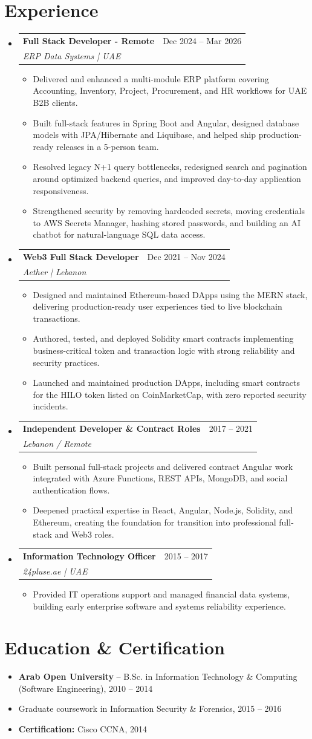\documentclass[a4paper,12pt]{article}
\makeatletter
\newcommand{\resumeItem}[1]{
  \item\small{{#1 \vspace{-3pt}}}
}
\newcommand{\resumeSubheading}[4]{
  \vspace{-2pt}\item
    \begin{tabular*}{0.97\textwidth}[t]{l@{\extracolsep{\fill}}r}
      \textbf{#1} & #2 \\
      \textit{\small#3} & \textit{\small #4} \\
    \end{tabular*}\vspace{-8pt}
}
\newcommand{\resumeSubHeadingListStart}{\begin{itemize}[leftmargin=0.15in, label={}]}
\newcommand{\resumeSubHeadingListEnd}{\end{itemize}}
\newcommand{\resumeItemListStart}{\begin{itemize}[leftmargin=0.18in]}
\newcommand{\resumeItemListEnd}{\end{itemize}\vspace{-6pt}}
\makeatother
\begin{document}
\section{Experience}
\resumeSubHeadingListStart
  \resumeSubheading
    {Full Stack Developer - Remote}{Dec 2024 -- Mar 2026}
    {ERP Data Systems | UAE}{}
    \resumeItemListStart
      \resumeItem{Delivered and enhanced a multi-module ERP platform covering Accounting, Inventory, Project, Procurement, and HR workflows for UAE B2B clients.}
      \resumeItem{Built full-stack features in Spring Boot and Angular, designed database models with JPA/Hibernate and Liquibase, and helped ship production-ready releases in a 5-person team.}
      \resumeItem{Resolved legacy N+1 query bottlenecks, redesigned search and pagination around optimized backend queries, and improved day-to-day application responsiveness.}
      \resumeItem{Strengthened security by removing hardcoded secrets, moving credentials to AWS Secrets Manager, hashing stored passwords, and building an AI chatbot for natural-language SQL data access.}
    \resumeItemListEnd

  \resumeSubheading
    {Web3 Full Stack Developer}{Dec 2021 -- Nov 2024}
    {Aether | Lebanon}{}
    \resumeItemListStart
      \resumeItem{Designed and maintained Ethereum-based DApps using the MERN stack, delivering production-ready user experiences tied to live blockchain transactions.}
      \resumeItem{Authored, tested, and deployed Solidity smart contracts implementing business-critical token and transaction logic with strong reliability and security practices.}
      \resumeItem{Launched and maintained production DApps, including smart contracts for the HILO token listed on CoinMarketCap, with zero reported security incidents.}
    \resumeItemListEnd

  \resumeSubheading
    {Independent Developer \& Contract Roles}{2017 -- 2021}
    {Lebanon / Remote}{}
    \resumeItemListStart
      \resumeItem{Built personal full-stack projects and delivered contract Angular work integrated with Azure Functions, REST APIs, MongoDB, and social authentication flows.}
      \resumeItem{Deepened practical expertise in React, Angular, Node.js, Solidity, and Ethereum, creating the foundation for transition into professional full-stack and Web3 roles.}
    \resumeItemListEnd

  \resumeSubheading
    {Information Technology Officer}{2015 -- 2017}
    {24pluse.ae | UAE}{}
    \resumeItemListStart
      \resumeItem{Provided IT operations support and managed financial data systems, building early enterprise software and systems reliability experience.}
    \resumeItemListEnd
\resumeSubHeadingListEnd

\section{Education \& Certification}
\resumeSubHeadingListStart
  \resumeItem{\textbf{Arab Open University} -- B.Sc. in Information Technology \& Computing (Software Engineering), 2010 -- 2014}
  \resumeItem{Graduate coursework in Information Security \& Forensics, 2015 -- 2016}
  \resumeItem{\textbf{Certification:} Cisco CCNA, 2014}
\resumeSubHeadingListEnd
\end{document}

